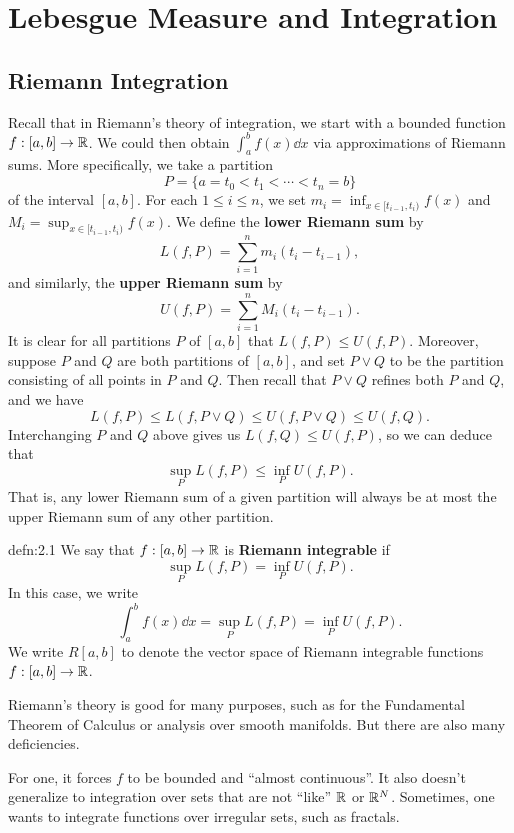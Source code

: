 \section{Lebesgue Measure and Integration}\label{sec:2}

\subsection{Riemann Integration}\label{subsec:2.1}
Recall that in Riemann's theory of integration, we start with a bounded function 
$f : [a, b] \to \mathbb{R}$. We could then obtain $\int_a^b f(x)\dd x$ via 
approximations of Riemann sums. More specifically, we take a partition 
\[ P = \{a = t_0 < t_1 < \cdots < t_n = b\} \] 
of the interval $[a, b]$. For each $1 \leq i \leq n$, we set 
$m_i = \inf_{x \in [t_{i-1}, t_i)} f(x)$ and 
$M_i = \sup_{x \in [t_{i-1}, t_i)} f(x)$. We define the {\bf lower 
Riemann sum} by 
\[ L(f, P) = \sum_{i=1}^n m_i(t_i - t_{i-1}), \] 
and similarly, the {\bf upper Riemann sum} by 
\[ U(f, P) = \sum_{i=1}^n M_i(t_i - t_{i-1}). \] 
It is clear for all partitions $P$ of $[a, b]$ that $L(f, P) \leq U(f, P)$. 
Moreover, suppose $P$ and $Q$ are both partitions of $[a, b]$, and set 
$P \vee Q$ to be the partition consisting of all points in $P$ and $Q$. 
Then recall that $P \vee Q$ refines both $P$ and $Q$, and we have 
\[ L(f, P) \leq L(f, P \vee Q) \leq U(f, P \vee Q) \leq U(f, Q). \] 
Interchanging $P$ and $Q$ above gives us $L(f, Q) \leq U(f, P)$, so we can 
deduce that 
\[ \sup_P L(f, P) \leq \inf_P U(f, P). \] 
That is, any lower Riemann sum of a given partition will always be at most 
the upper Riemann sum of any other partition. 

\begin{defn}{defn:2.1}
    We say that $f : [a, b] \to \mathbb{R}$ is {\bf Riemann integrable} if 
    \[ \sup_P L(f, P) = \inf_P U(f, P). \] 
    In this case, we write 
    \[ \int_a^b f(x)\dd x = \sup_P L(f, P) = \inf_P U(f, P). \] 
    We write $R[a, b]$ to denote the vector space of Riemann integrable 
    functions $f : [a, b] \to \mathbb{R}$. 
\end{defn}

Riemann's theory is good for many purposes, such as for the Fundamental 
Theorem of Calculus or analysis over smooth manifolds. But there are also 
many deficiencies. 

For one, it forces $f$ to be bounded and ``almost continuous''. It also doesn't 
generalize to integration over sets that are not ``like'' $\mathbb{R}$ or $\mathbb{R}^N$. 
Sometimes, one wants to integrate functions over irregular sets, such as fractals. 

